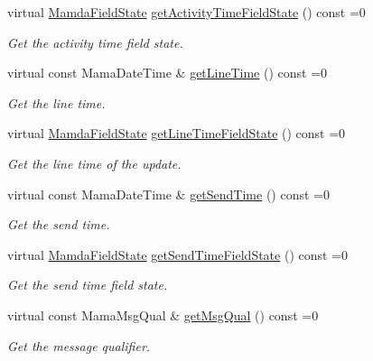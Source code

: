 \begin{CompactItemize}
virtual \hyperlink{namespaceWombat_93aac974f2ab713554fd12a1fa3b7d2a}{Mamda\-Field\-State} \hyperlink{classWombat_1_1MamdaBasicEvent_a61a566e3442181ca1fadc4524296cd0}{get\-Activity\-Time\-Field\-State} () const =0
\begin{CompactList}\small\item\em Get the activity time field state. \item\end{CompactList}\item 
virtual const Mama\-Date\-Time \& \hyperlink{classWombat_1_1MamdaBasicEvent_3fcc26fa1a6446bcec12b11ac74ed26d}{get\-Line\-Time} () const =0
\begin{CompactList}\small\item\em Get the line time. \item\end{CompactList}\item 
virtual \hyperlink{namespaceWombat_93aac974f2ab713554fd12a1fa3b7d2a}{Mamda\-Field\-State} \hyperlink{classWombat_1_1MamdaBasicEvent_eb06352aca3280c5e89bad7a3b185cdf}{get\-Line\-Time\-Field\-State} () const =0
\begin{CompactList}\small\item\em Get the line time of the update. \item\end{CompactList}\item 
virtual const Mama\-Date\-Time \& \hyperlink{classWombat_1_1MamdaBasicEvent_b0602a83bec20cd8b341ec866ff3bffa}{get\-Send\-Time} () const =0
\begin{CompactList}\small\item\em Get the send time. \item\end{CompactList}\item 
virtual \hyperlink{namespaceWombat_93aac974f2ab713554fd12a1fa3b7d2a}{Mamda\-Field\-State} \hyperlink{classWombat_1_1MamdaBasicEvent_418ecb29b412cd42581b54c87b5360fd}{get\-Send\-Time\-Field\-State} () const =0
\begin{CompactList}\small\item\em Get the send time field state. \item\end{CompactList}\item 
virtual const Mama\-Msg\-Qual \& \hyperlink{classWombat_1_1MamdaBasicEvent_675ce8f1de581548426335423d6b3864}{get\-Msg\-Qual} () const =0
\begin{CompactList}\small\item\em Get the message qualifier. \item\end{CompactList}\item 

\end{CompactItemize}
